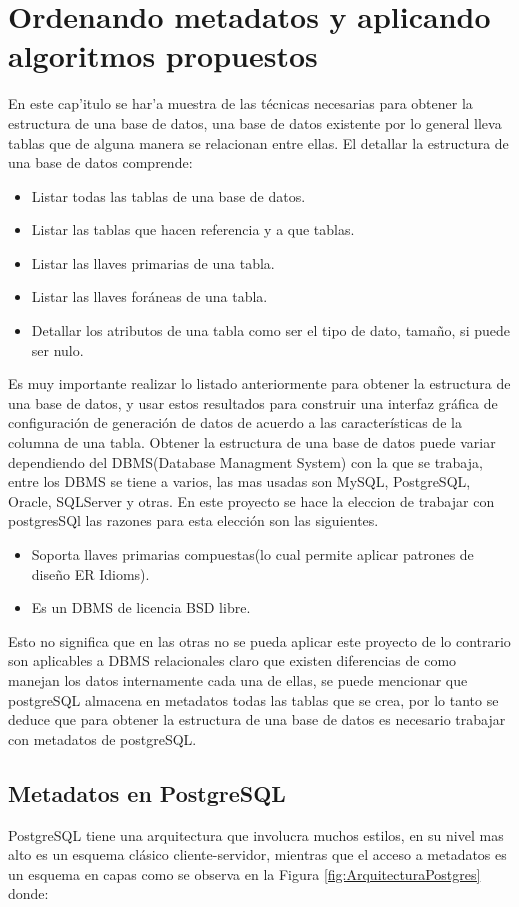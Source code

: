 \chapter{Ordenando metadatos y aplicando algoritmos propuestos}

En este cap'itulo se har'a muestra de las t\'ecnicas necesarias para obtener la estructura de una base de datos, una base de datos existente por lo general lleva tablas que de alguna manera se relacionan entre ellas. El detallar la estructura de una base de datos comprende:
\begin{itemize}
\item Listar todas las tablas de una base de datos.
\item Listar las tablas que hacen referencia y a que tablas.
\item Listar las llaves primarias de una tabla.
\item Listar las llaves for\'aneas de una tabla.
\item Detallar los atributos de una tabla como ser el tipo de dato, tama\~no, si puede ser nulo. 
\end{itemize} 
Es muy importante realizar lo listado anteriormente para obtener la estructura de una base de datos, y usar estos resultados para construir una interfaz gr\'afica de configuraci\'on de generaci\'on de datos de acuerdo a las caracter\'isticas de la columna de una tabla.
Obtener la estructura de una base de datos puede variar dependiendo del DBMS(Database Managment System) con la que se trabaja, entre los DBMS se tiene a varios, las mas usadas son MySQL, PostgreSQL, Oracle, SQLServer y otras. En este proyecto se hace la eleccion de  trabajar con postgresSQl las razones para esta elecci\'on son las siguientes.
\begin{itemize}
\item Soporta llaves primarias compuestas(lo cual permite aplicar patrones de dise\~no ER Idioms).
\item Es un DBMS de licencia BSD libre.
\end{itemize}
Esto no significa que en las otras no se pueda aplicar este proyecto de lo contrario son aplicables a DBMS relacionales claro que existen diferencias de como manejan los datos internamente cada una de ellas, se puede mencionar que postgreSQL almacena en metadatos todas las tablas que se crea, por lo tanto se deduce que para obtener la estructura de una base de datos es necesario trabajar con metadatos de postgreSQL.
\section{Metadatos en PostgreSQL}
PostgreSQL tiene una arquitectura que involucra muchos estilos, en su nivel mas alto es un esquema cl\'asico cliente-servidor, mientras que el acceso a metadatos es un esquema en capas como se observa en la Figura \ref{fig:ArquitecturaPostgres} donde:

